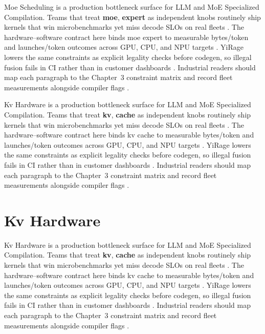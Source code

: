 Moe Scheduling is a production bottleneck surface for LLM and MoE Specialized Compilation. Teams that treat \textbf{moe}, \textbf{expert} as independent knobs routinely ship kernels that win microbenchmarks yet miss decode SLOs on real fleets \citep{patel2025llminference,nvidia2022hopper}. The hardware--software contract here binds moe expert to measurable bytes/token and launches/token outcomes across GPU, CPU, and NPU targets \citep{taxbreak2026,semianalysis2024tma}. YiRage lowers the same constraints as explicit legality checks before codegen, so illegal fusion fails in CI rather than in customer dashboards \citep{memoryfloor2026,amd2024xdna}. Industrial readers should map each paragraph to the Chapter~3 constraint matrix and record fleet measurements alongside compiler flags \citep{nvidia2022hopper,amd2024aie}.

Kv Hardware is a production bottleneck surface for LLM and MoE Specialized Compilation. Teams that treat \textbf{kv}, \textbf{cache} as independent knobs routinely ship kernels that win microbenchmarks yet miss decode SLOs on real fleets \citep{taxbreak2026,semianalysis2024tma}. The hardware--software contract here binds kv cache to measurable bytes/token and launches/token outcomes across GPU, CPU, and NPU targets \citep{memoryfloor2026,amd2024xdna}. YiRage lowers the same constraints as explicit legality checks before codegen, so illegal fusion fails in CI rather than in customer dashboards \citep{nvidia2022hopper,amd2024aie}. Industrial readers should map each paragraph to the Chapter~3 constraint matrix and record fleet measurements alongside compiler flags \citep{semianalysis2024tma,dlbook}.

\section{Kv Hardware}
\label{sec:kv_hardware}

Kv Hardware is a production bottleneck surface for LLM and MoE Specialized Compilation. Teams that treat \textbf{kv}, \textbf{cache} as independent knobs routinely ship kernels that win microbenchmarks yet miss decode SLOs on real fleets \citep{memoryfloor2026,amd2024xdna}. The hardware--software contract here binds kv cache to measurable bytes/token and launches/token outcomes across GPU, CPU, and NPU targets \citep{nvidia2022hopper,amd2024aie}. YiRage lowers the same constraints as explicit legality checks before codegen, so illegal fusion fails in CI rather than in customer dashboards \citep{semianalysis2024tma,dlbook}. Industrial readers should map each paragraph to the Chapter~3 constraint matrix and record fleet measurements alongside compiler flags \citep{amd2024xdna,dao2022flashattention}.

